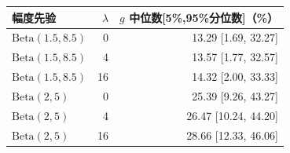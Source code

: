 \begin{tabular}{lrr}
\toprule
幅度先验 & $\lambda$ & $g$ 中位数[5\%,95\%分位数]（\%） \\
\midrule
$\mathrm{Beta}(1.5,8.5)$ & 0 & 13.29 [1.69, 32.27] \\
$\mathrm{Beta}(1.5,8.5)$ & 4 & 13.57 [1.77, 32.57] \\
$\mathrm{Beta}(1.5,8.5)$ & 16 & 14.32 [2.00, 33.33] \\
$\mathrm{Beta}(2,5)$ & 0 & 25.39 [9.26, 43.27] \\
$\mathrm{Beta}(2,5)$ & 4 & 26.47 [10.24, 44.20] \\
$\mathrm{Beta}(2,5)$ & 16 & 28.66 [12.33, 46.06] \\
\bottomrule
\end{tabular}
